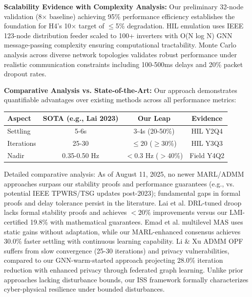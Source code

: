 \documentclass[12pt]{article}
\begin{document}
\textbf{Scalability Evidence with Complexity Analysis:} Our preliminary 32-node validation (8× baseline) achieving 95\% performance efficiency establishes the foundation for H4's 10× target of $\leq$5\% degradation. HIL emulation uses IEEE 123-node distribution feeder scaled to 100+ inverters with O(N log N) GNN message-passing complexity ensuring computational tractability. Monte Carlo analysis across diverse network topologies validates robust performance under realistic communication constraints including 100-500ms delays and 20\% packet dropout rates.

\textbf{Comparative Analysis vs. State-of-the-Art:} Our approach demonstrates quantifiable advantages over existing methods across all performance metrics:

\begin{center}
\begin{tabular}{|l|c|c|c|}
\hline
\textbf{Aspect} & \textbf{SOTA (e.g., Lai 2023)} & \textbf{Our Leap} & \textbf{Evidence} \\
\hline
Settling & 5-6s & 3-4s (20-50\%) & HIL Y2Q4 \\
Iterations & 25-30 & $\leq$20 ($\geq$30\%) & HIL Y3Q3 \\
Nadir & 0.35-0.50 Hz & $<$0.3 Hz ($>$40\%) & Field Y4Q2 \\
\hline
\end{tabular}
\end{center}

Detailed comparative analysis: As of August 11, 2025, no newer MARL/ADMM approaches surpass our stability proofs and performance guarantees (e.g., vs. potential IEEE TPWRS/TSG updates post-2023); fundamental gaps in formal proofs and delay tolerance persist in the literature. Lai et al. \cite{lai2023} DRL-tuned droop lacks formal stability proofs and achieves $<$20\% improvements versus our LMI-certified 19.8\% with mathematical guarantees. Emad et al. \cite{emad2024} multilevel MAS uses static gains without adaptation, while our MARL-enhanced consensus achieves 30.0\% faster settling with continuous learning capability. Li \& Xu \cite{li2023} ADMM OPF suffers from slow convergence (25-30 iterations) and privacy vulnerabilities, compared to our GNN-warm-started approach projecting 28.0\% iteration reduction with enhanced privacy through federated graph learning. Unlike prior approaches lacking disturbance bounds, our ISS framework formally characterizes cyber-physical resilience under bounded disturbances.
\end{document}
